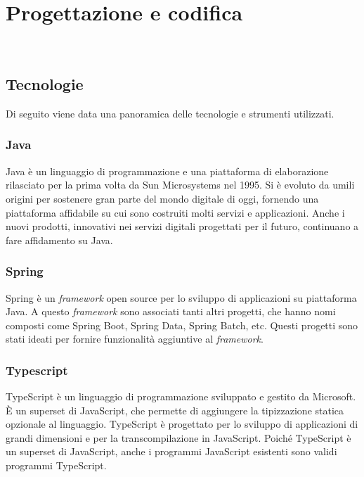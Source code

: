 
\chapter{Progettazione e codifica}
\label{cap:progettazione-codifica}

\\

\section{Tecnologie}
\label{sec:tecnologie-strumenti}

Di seguito viene data una panoramica delle tecnologie e strumenti utilizzati.

\subsection*{Java}
Java è un linguaggio di programmazione e una piattaforma di elaborazione 
rilasciato per la prima volta da Sun Microsystems nel 1995. Si è evoluto da umili
 origini per sostenere gran parte del mondo digitale di oggi, fornendo una
 piattaforma affidabile su cui sono costruiti molti servizi e applicazioni. 
 Anche i nuovi prodotti, innovativi nei servizi digitali progettati per il futuro,  
 continuano a fare affidamento su Java.
\subsection*{Spring}
Spring è un \textit{framework} open source per lo sviluppo di applicazioni su piattaforma Java.
A questo \textit{framework} sono associati tanti altri progetti, che hanno nomi composti come 
Spring Boot, Spring Data, Spring Batch, etc. Questi progetti sono stati ideati per
fornire funzionalità aggiuntive al \textit{framework}.

\subsection*{Typescript}
TypeScript è un linguaggio di programmazione sviluppato e gestito da Microsoft. 
È un \gls{superset} di JavaScript, che permette di aggiungere la tipizzazione 
statica opzionale al linguaggio. TypeScript è progettato per lo sviluppo di applicazioni 
di grandi dimensioni e per la \gls{transcompilazione} in JavaScript. Poiché TypeScript è un \gls{superset} di JavaScript, anche i programmi JavaScript esistenti sono validi programmi TypeScript.

